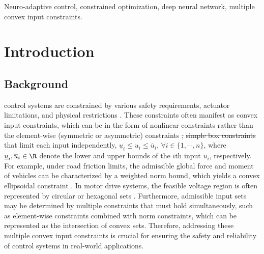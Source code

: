 \documentclass[letterpaper, journal]{IEEEtran}
\providecommand{\DIFdel}[1]{{\protect\color{red}\sout{#1}}} %
\providecommand{\DIFdelbegin}{} %
\providecommand{\DIFdelend}{} %
\begin{document}
\begin{IEEEkeywords}
  Neuro-adaptive control, constrained optimization, deep neural network,  multiple convex input constraints.
\end{IEEEkeywords}

\section{Introduction}

\subsection{Background}

 control systems are constrained by various safety requirements, actuator limitations, and physical restrictions \cite{Ji:2025aa}.
These constraints often manifest as convex input constraints, which can be in the form of nonlinear constraints rather than the element-wise (symmetric or asymmetric) constraints \DIFdelbegin \DIFdel{, }%
\DIFdel{simple box constraints }\DIFdelend that limit each input independently, \ie $\underline{u}_i\le u_i\le\overline{u}_i$, $\forall i\in\{1,\cdots,n\}$, where $\underline{u}_i,\overline{u}_i\in\R$ denote the lower and upper bounds of the $i$th input $u_i$, respectively.
\DIFdelbegin %
\DIFdelend For example, under road friction limits, the admissible global force and moment of vehicles can be characterized by a weighted norm bound, which yields a convex ellipsoidal constraint \cite{Chen:2024aa}.
In motor drive systems, the feasible voltage region is often represented by circular \cite{Ryu:2025aa} or hexagonal sets \cite{Monzen:2026aa}.
Furthermore, admissible input sets may be determined by multiple constraints that must hold simultaneously, such as element-wise constraints combined with norm constraints, which can be represented as the intersection of convex sets.
Therefore, addressing these multiple convex input constraints is crucial for ensuring the safety and reliability of control systems in real-world applications.
\end{document}
